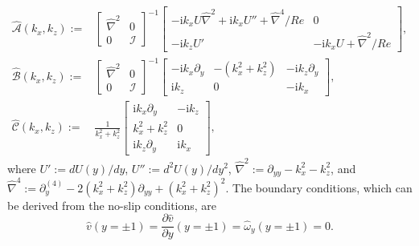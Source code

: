 \begin{subequations}
\label{eq:operator_ABC}
\begin{align}
    \widehat{\mathcal{A}}(k_x,k_z):=&\begin{bmatrix}\widehat{{\nabla}}^2 & 0\\
    0 & \mathcal{I}
    \end{bmatrix}^{-1}\begin{bmatrix}
    -\text{i}k_xU{\widehat{\nabla}}^2+\text{i}k_xU''+\widehat{{\nabla}}^4/Re & 0\\
    -\text{i}k_zU' & -\text{i}k_x U+\widehat{{\nabla}}^2/Re
    \end{bmatrix},\label{eq:operator_ABC_A}\\
    \mathcal{\widehat{B}}(k_x,k_z):=& \begin{bmatrix}\widehat{{\nabla}}^2 & 0\\
    0 & \mathcal{I}
    \end{bmatrix}^{-1}
    \begin{bmatrix}
    -\text{i}k_x\partial_y & -(k_x^2+k_z^2) & -\text{i}k_z \partial_y\\
    \text{i}k_z & 0 & -\text{i}k_x
    \end{bmatrix},\label{eq:operator_ABC_B}\\
    \mathcal{\widehat{C}}(k_x,k_z):=&\frac{1}{k_x^2+k_z^2}\begin{bmatrix}
    \text{i}k_x\partial_y & -\text{i}k_z\\
    k_x^2+k_z^2 & 0\\
    \text{i}k_z \partial_y & \text{i}k_x
    \end{bmatrix},\label{eq:operator_ABC_C}
\end{align}
\end{subequations}
\endgroup
where $U':=dU(y)/dy$, $U'':=d^2U(y)/dy^2$, $\widehat{{\nabla}}^2:=\partial_{yy}-k_x^2-k_z^2$, and $\widehat{\nabla}^4:=\partial^{(4)}_{y}-2(k_x^2+k_z^2)\partial_{yy}+(k_x^2+k_z^2)^2$. The boundary conditions, which can be derived from the no-slip conditions, are
\begin{equation}
    \widehat{v}(y=\pm 1)=
    \frac{\partial \widehat{v}}{\partial y}(y=\pm1)=\widehat{\omega}_y(y=\pm 1)=0.
    \label{eq:BC}
\end{equation}


